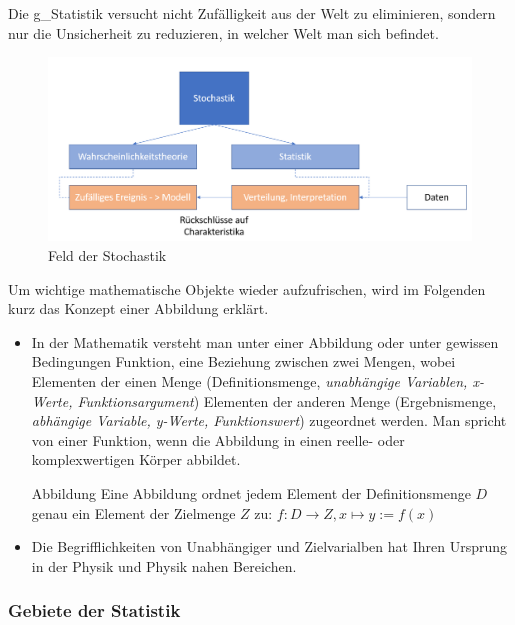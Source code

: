 Die \gls{g_Statistik} versucht nicht Zufälligkeit aus der Welt zu eliminieren, sondern nur die Unsicherheit zu reduzieren, in welcher Welt man sich befindet.

\begin{figure}[H]
	\centering
	\includegraphics[scale = 0.6]{attachment/chapter_8/Scc001}
	\caption{Feld der Stochastik}
\end{figure}

Um wichtige mathematische Objekte wieder aufzufrischen, wird im Folgenden kurz das Konzept einer Abbildung erklärt.\\

\begin{itemize}
	\item In der Mathematik versteht man unter einer Abbildung oder unter gewissen Bedingungen Funktion, eine Beziehung zwischen zwei Mengen, wobei Elementen der einen Menge (Definitionsmenge, \textit{unabhängige Variablen, x-Werte, Funktionsargument}) Elementen der anderen Menge (Ergebnismenge, \textit{abhängige Variable, y-Werte, Funktionswert}) zugeordnet werden. Man spricht von einer Funktion, wenn die Abbildung in einen reelle- oder komplexwertigen Körper abbildet.\cite{Abbildung.01}
\begin{Definition}{Abbildung}
	Eine Abbildung ordnet jedem Element der Definitionsmenge $D$ genau ein Element der Zielmenge $Z$ zu: $f: D\rightarrow Z, x\mapsto y:=f(x)$
\end{Definition}
\item Die Begrifflichkeiten von Unabhängiger und Zielvarialben hat Ihren Ursprung in der Physik und Physik nahen Bereichen.
\end{itemize}

\subsubsection{Gebiete der Statistik}

